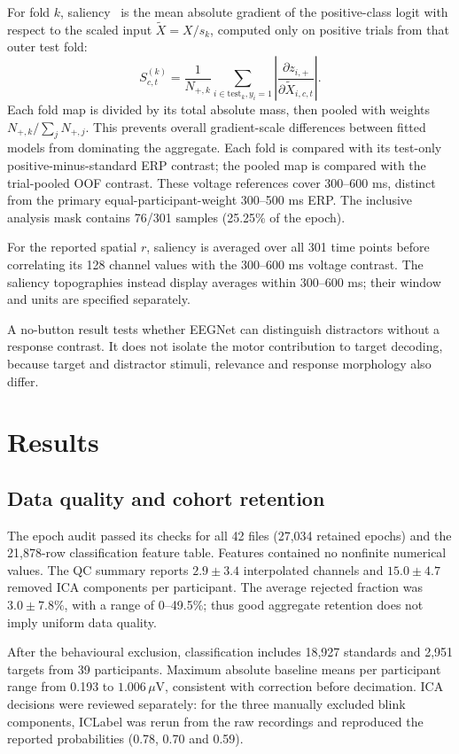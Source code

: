 \documentclass[11pt,a4paper]{article}
\begin{document}
For fold $k$, saliency~\cite{simonyan} is the mean absolute gradient of the positive-class logit with respect to the scaled input $\widetilde X=X/s_k$, computed only on positive trials from that outer test fold:
\begin{equation}
S^{(k)}_{c,t}=\frac{1}{N_{+,k}}\sum_{i\in\mathrm{test}_k,y_i=1}
\left|\frac{\partial z_{i,+}}{\partial\widetilde X_{i,c,t}}\right|.
\end{equation}
Each fold map is divided by its total absolute mass, then pooled with weights $N_{+,k}/\sum_jN_{+,j}$. This prevents overall gradient-scale differences between fitted models from dominating the aggregate. Each fold is compared with its test-only positive-minus-standard ERP contrast; the pooled map is compared with the trial-pooled OOF contrast. These voltage references cover 300--600 ms, distinct from the primary equal-participant-weight 300--500 ms ERP. The inclusive analysis mask contains 76/301 samples (25.25\% of the epoch).

For the reported spatial $r$, saliency is averaged over all 301 time points before correlating its 128 channel values with the 300--600 ms voltage contrast. The saliency topographies instead display averages within 300--600 ms; their window and units are specified separately.

A no-button result tests whether EEGNet can distinguish distractors without a response contrast. It does not isolate the motor contribution to target decoding, because target and distractor stimuli, relevance and response morphology also differ.

\section{Results}
\subsection{Data quality and cohort retention}
The epoch audit passed its checks for all 42 files (27,034 retained epochs) and the 21,878-row classification feature table. Features contained no nonfinite numerical values. The QC summary reports $2.9\pm3.4$ interpolated channels and $15.0\pm4.7$ removed ICA components per participant. The average rejected fraction was $3.0\pm7.8\%$, with a range of 0--49.5\%; thus good aggregate retention does not imply uniform data quality.

After the behavioural exclusion, classification includes 18,927 standards and 2,951 targets from 39 participants. Maximum absolute baseline means per participant range from 0.193 to $1.006\,\mu$V, consistent with correction before decimation. ICA decisions were reviewed separately: for the three manually excluded blink components, ICLabel was rerun from the raw recordings and reproduced the reported probabilities (0.78, 0.70 and 0.59).
\end{document}

